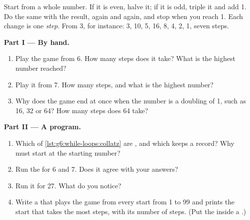 \begin{problem}\label{pb:g6:while-loops:1}
Start from a whole number. If it is even, halve it; if it is odd, triple it and
add 1. Do the same with the result, again and again, and stop when you reach 1.
Each change is one \emph{step}. From 3, for instance: 3, 10, 5, 16, 8, 4, 2, 1,
seven steps.

\medskip\noindent\textbf{Part I --- By hand.}
\begin{enumerate}
  \item Play the game from 6. How many steps does it take? What is the
    highest number reached?
  \item Play it from 7. How many steps, and what is the highest number?
  \item Why does the game end at once when the number is a doubling of 1, such
    as 16, 32 or 64? How many steps does 64 take?
\end{enumerate}

\medskip\noindent\textbf{Part II --- A program.}

\label{lst:g6:while-loops:collatz}

\begin{enumerate}[resume]
  \item Which  of \cref{lst:g6:while-loops:collatz} are , and
    which keeps a record? Why must  start at the starting number?
  \item Run the  for 6 and 7. Does it agree with your answers?
  \item Run it for 27. What do you notice?
  \item Write a  that plays the game from every start from 1 to 99 and
    prints the start that takes the most steps, with its number of steps. (Put
    the   inside a  .)
\end{enumerate}


\end{problem}
